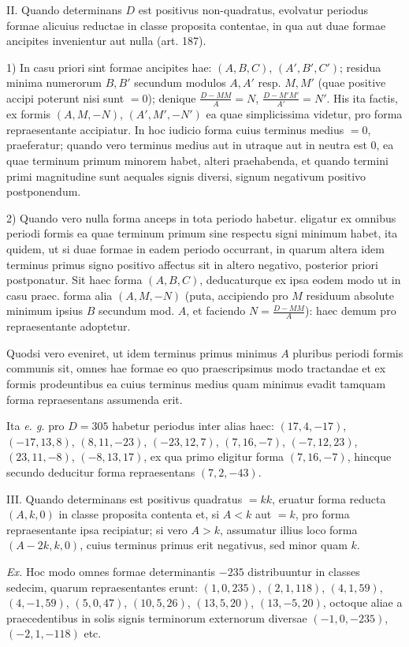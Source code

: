 II. Quando determinans $D$ est positivus non-quadratus, evolvatur periodus formae
alicuius reductae in classe proposita contentae, in qua aut duae formae ancipites
invenientur aut nulla (art. 187).

1) In casu priori sint formae ancipites hae: $(A,B,C)$, $(A',B',C')$;
residua minima numerorum $B,B'$ secundum modulos $A,A'$ resp. $M,M'$
(quae positive accipi poterunt nisi sunt $=0$); denique
$\frac{D-MM}{A}=N$, $\frac{D-M'M'}{A'}=N'$.
His ita factis, ex formis $(A,M,-N)$, $(A',M',-N')$ ea quae simplicissima
videtur, pro forma repraesentante accipiatur. In hoc iudicio forma cuius terminus
medius $=0$, praeferatur; quando vero terminus medius aut in utraque aut in
neutra est $0$, ea quae terminum primum minorem habet, alteri praehabenda,
et quando termini primi magnitudine sunt aequales signis diversi, signum negativum
positivo postponendum.

2) Quando vero nulla forma anceps in tota periodo habetur. eligatur ex omnibus
periodi formis ea quae terminum primum sine respectu signi minimum
habet, ita quidem, ut si duae formae in eadem periodo occurrant, in quarum altera
idem terminus primus signo positivo affectus sit in altero negativo, posterior
priori postponatur. Sit haec forma $(A,B,C)$, deducaturque ex ipsa eodem modo
ut in casu praec. forma alia $(A,M,-N)$ (puta, accipiendo pro $M$ residuum
absolute minimum ipsius $B$ secundum mod. $A$, et faciendo
$N=\frac{D-MM}{A}$): haec demum pro repraesentante adoptetur.

Quodsi vero eveniret, ut idem terminus primus minimus $A$ pluribus periodi formis
communis sit, omnes hae formae eo quo praescripsimus modo tractandae et ex formis
prodeuntibus ea cuius terminus medius quam minimus evadit tamquam forma
repraesentans assumenda erit.

Ita \textit{e. g.} pro $D=305$ habetur periodus inter alias haec:
$(17,4,-17)$, $(-17,13,8)$, $(8,11,-23)$, $(-23,12,7)$,
$(7,16,-7)$, $(-7,12,23)$, $(23,11,-8)$, $(-8,13,17)$,
ex qua primo eligitur forma $(7,16,-7)$, hincque secundo deducitur forma
repraesentans $(7,2,-43)$.

III. Quando determinans est positivus quadratus $=kk$, eruatur forma reducta
$(A,k,0)$ in classe proposita contenta et, si $A<k$ aut $=k$, pro forma
repraesentante ipsa recipiatur; si vero $A>k$, assumatur illius loco forma
$(A-2k,k,0)$, cuius terminus primus erit negativus, sed minor quam $k$.

\textit{Ex.} Hoc modo omnes formae determinantis $-235$ distribuuntur in classes
sedecim, quarum repraesentantes erunt: $(1,0,235)$, $(2,1,118)$,
$(4,1,59)$, $(4,-1,59)$, $(5,0,47)$, $(10,5,26)$,
$(13,5,20)$, $(13,-5,20)$, octoque aliae a praecedentibus in solis signis
terminorum externorum diversae $(-1,0,-235)$, $(-2,1,-118)$ etc.

